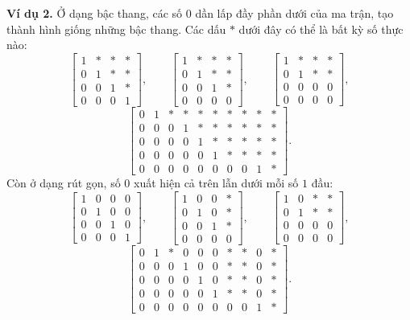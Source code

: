 \documentclass[12pt,a4paper]{article}
\begin{document}
\textbf{Ví dụ 2.} Ở dạng bậc thang, các số \(0\) dần lấp đầy phần dưới của ma trận, tạo thành hình giống những bậc thang. Các dấu \(\ast\) dưới đây có thể là bất kỳ số thực nào:
$$
\left[ \begin{array}{cccc} 1 & \ast & \ast & \ast \\ 0 & 1 & \ast & \ast \\ 0 & 0 & 1 & \ast \\ 0 & 0 & 0 & 1 \end{array} \right],\qquad
\left[ \begin{array}{cccc} 1 & \ast & \ast & \ast \\ 0 & 1 & \ast & \ast \\ 0 & 0 & 1 & \ast \\ 0 & 0 & 0 & 0 \end{array} \right],\qquad
\left[ \begin{array}{cccc} 1 & \ast & \ast & \ast \\ 0 & 1 & \ast & \ast \\ 0 & 0 & 0 & 0 \\ 0 & 0 & 0 & 0 \end{array} \right],
$$
$$
\left[ \begin{array}{cccccccccc} 0 & 1 & \ast & \ast & \ast & \ast & \ast & \ast & \ast & \ast \\ 0 & 0 & 0 & 1 & \ast & \ast & \ast & \ast & \ast & \ast \\ 0 & 0 & 0 & 0 & 1 & \ast & \ast & \ast & \ast & \ast \\ 0 & 0 & 0 & 0 & 0 & 1 & \ast & \ast & \ast & \ast \\ 0 & 0 & 0 & 0 & 0 & 0 & 0 & 0 & 1 & \ast \end{array} \right].
$$
Còn ở dạng rút gọn, số \(0\) xuất hiện cả trên lẫn dưới mỗi số \(1\) đầu:
$$
\left[ \begin{array}{cccc} 1 & 0 & 0 & 0 \\ 0 & 1 & 0 & 0 \\ 0 & 0 & 1 & 0 \\ 0 & 0 & 0 & 1 \end{array} \right],\qquad
\left[ \begin{array}{cccc} 1 & 0 & 0 & \ast \\ 0 & 1 & 0 & \ast \\ 0 & 0 & 1 & \ast \\ 0 & 0 & 0 & 0 \end{array} \right],\qquad
\left[ \begin{array}{cccc} 1 & 0 & \ast & \ast \\ 0 & 1 & \ast & \ast \\ 0 & 0 & 0 & 0 \\ 0 & 0 & 0 & 0 \end{array} \right],
$$
$$
\left[ \begin{array}{cccccccccc} 0 & 1 & \ast & 0 & 0 & 0 & \ast & \ast & 0 & \ast \\ 0 & 0 & 0 & 1 & 0 & 0 & \ast & \ast & 0 & \ast \\ 0 & 0 & 0 & 0 & 1 & 0 & \ast & \ast & 0 & \ast \\ 0 & 0 & 0 & 0 & 0 & 1 & \ast & \ast & 0 & \ast \\ 0 & 0 & 0 & 0 & 0 & 0 & 0 & 0 & 1 & \ast \end{array} \right].
$$
\end{document}
